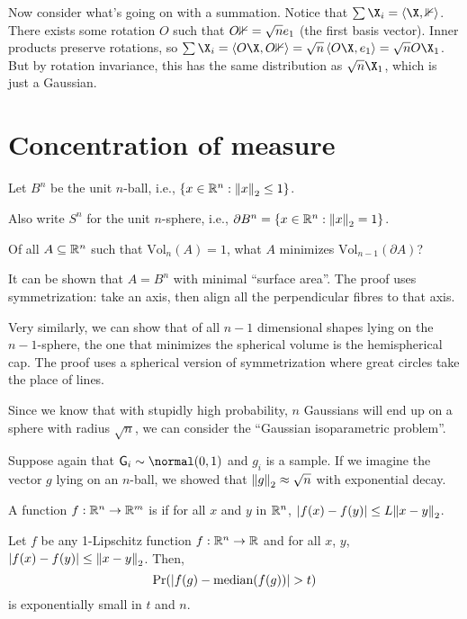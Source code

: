 \documentclass[class=co432,notes,tikz]{agony}
\begin{document}
Now consider what's going on with a summation.
Notice that $\sum \X_i = \ev{\X, \bb 1}$.
There exists some rotation $O$ such that $O\mathbb 1 =\sqrt{n}e_1$ (the first basis vector).
Inner products preserve rotations, so $\sum \X_i = \ev{O\X,O\bb 1} = \sqrt{n}\ev{O\X,e_1} = \sqrt{n}O\X_1$.
But by rotation invariance, this has the same distribution as $\sqrt{n}\X_1$,
which is just a Gaussian.

\section{Concentration of measure}
\begin{defn*}[shapes!]
  Let $B^n$ be the unit $n$-ball, i.e., $\{x\in\mathbb{R}^n : \norm{x}_2 \leq 1\}$.

  Also write $S^n$ for the unit $n$-sphere, i.e., $\partial B^n = \{x\in\mathbb{R}^n : \norm{x}_2 = 1\}$.
\end{defn*}

\begin{problem}
  Of all $A \subseteq \mathbb{R}^n$ such that $\text{Vol}_n(A) = 1$,
  what $A$ minimizes $\text{Vol}_{n-1}(\partial A)$?
\end{problem}

It can be shown that $A = B^n$ with minimal ``surface area''.
The proof uses symmetrization:
take an axis, then align all the perpendicular fibres to that axis.

Very similarly, we can show that of all $n-1$ dimensional shapes lying
on the $n-1$-sphere, the one that minimizes the spherical volume is the hemispherical cap.
The proof uses a spherical version of symmetrization
where great circles take the place of lines.

Since we know that with stupidly high probability,
$n$ \iid Gaussians will end up on a sphere with radius $\sqrt{n}$,
we can consider the ``Gaussian isoparametric problem''.

Suppose again that $\rv G_i \sim \normal(0,1)$ and $g_i$ is a sample.
If we imagine the vector $g$ lying on an $n$-ball,
we showed that $\norm{g}_2 \approx \sqrt{n}$ with exponential decay.

\begin{defn}
  A function $f : \mathbb{R}^n \to \mathbb{R}^m$ is 
  if for all $x$ and $y$ in $\mathbb{R}^n$, $\abs{f(x) - f(y)} \leq L\norm{x-y}_2$.
\end{defn}

\begin{theorem}\label{thm:gci}
  Let $f$ be any 1-Lipschitz function $f : \mathbb{R}^n \to \mathbb{R}$ and for all $x$, $y$,
  $\abs{f(x)-f(y)} \leq \norm{x-y}_2$. Then,
  \[ \Pr(\abs{f(g) - \text{median}(f(g))} > t) \]
  is exponentially small in $t$ and $n$.
\end{theorem}
\end{document}
